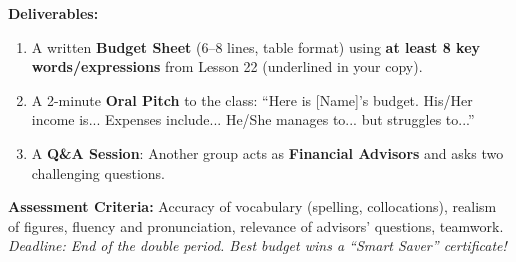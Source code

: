 \documentclass[11pt]{article}
\begin{document}
\begin{textebox}
\textbf{Deliverables:}
\begin{enumerate}
    \item A written \textbf{Budget Sheet} (6–8 lines, table format) using \textbf{at least 8 key words/expressions} from Lesson 22 (underlined in your copy).
    \item A 2-minute \textbf{Oral Pitch} to the class: “Here is [Name]'s budget. His/Her income is... Expenses include... He/She manages to... but struggles to...”
    \item A \textbf{Q\&A Session}: Another group acts as \textbf{Financial Advisors} and asks two challenging questions.
\end{enumerate}

\textbf{Assessment Criteria:} Accuracy of vocabulary (spelling, collocations), realism of figures, fluency and pronunciation, relevance of advisors' questions, teamwork.
\textit{Deadline: End of the double period. Best budget wins a “Smart Saver” certificate!}
\end{textebox}
\end{document}
